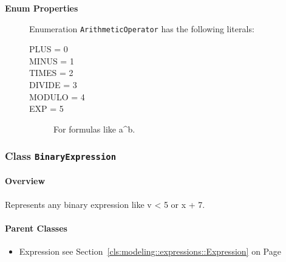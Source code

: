 \begin{description}

	\item[\textbf{Enum Properties}] Enumeration \texttt{ArithmeticOperator} has the following literals:

	\begin{description}
		
		\item[PLUS = 0]
		\hspace{\fill}
		\nopagebreak

		\item[MINUS = 1]
		\hspace{\fill}
		\nopagebreak

		\item[TIMES = 2]
		\hspace{\fill}
		\nopagebreak

		\item[DIVIDE = 3]
		\hspace{\fill}
		\nopagebreak

		\item[MODULO = 4]
		\hspace{\fill}
		\nopagebreak

		\item[EXP = 5]
		\hspace{\fill}
		\nopagebreak
		
For formulas like a\^{}b.	
 
	\end{description}

\end{description}



\subsubsection{\Large{Class \bfseries \texttt{BinaryExpression}\normalfont}}
\label{cls:modeling::expressions::BinaryExpression} 
\paragraph{Overview}

	
			
Represents any binary expression like v < 5 or x + 7.	
		
	



\paragraph{Parent Classes}
\begin{itemize}
\item Expression see Section~\ref{cls:modeling::expressions::Expression} on Page~\pageref{cls:modeling::expressions::Expression}\end{itemize}
